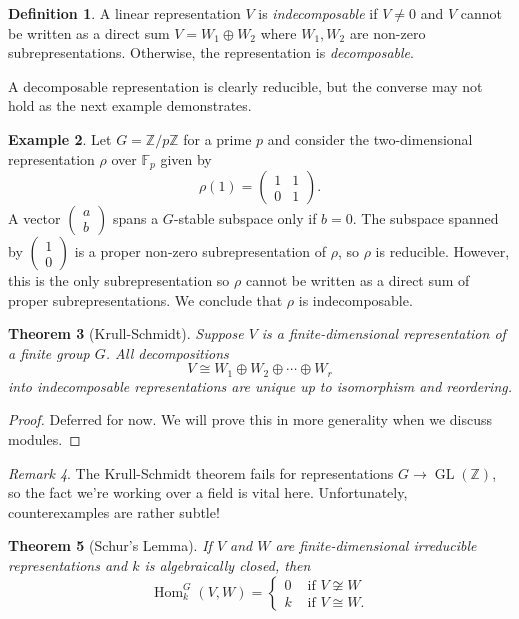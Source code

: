 \documentclass[12pt]{article}
\theoremstyle{plain}
\newtheorem{theorem}{Theorem}[section]
\theoremstyle{definition}
\newtheorem{definition}[theorem]{Definition}
\newtheorem{example}[theorem]{Example}
\theoremstyle{remark}
\newtheorem{remark}[theorem]{Remark}
\numberwithin{equation}{section}
\begin{document}
\begin{definition}
A linear representation $V$ is \emph{indecomposable} if $V \ne 0$ and
$V$ cannot be written as a direct sum $V = W_1 \oplus W_2$ where
$W_1, W_2$ are non-zero subrepresentations.
Otherwise, the representation is \emph{decomposable}.
\end{definition}

A decomposable representation is clearly reducible, but the converse may
not hold as the next example demonstrates.

\begin{example}
Let $G=\mathbb{Z}/p\mathbb{Z}$ for a prime $p$
and consider the two-dimensional representation $\rho$ over $\mathbb{F}_p$
given by
\[
\rho(1) = \begin{pmatrix} 1&1\\0&1 \end{pmatrix} .
\]
A vector $\begin{pmatrix} a\\b \end{pmatrix} $ spans a
$G$-stable subspace only if $b=0$.
The subspace spanned by $\begin{pmatrix} 1\\0 \end{pmatrix}$
is a proper non-zero subrepresentation
of $\rho$, so $\rho$ is reducible.
However, this is the only subrepresentation so $\rho$
cannot be written as a direct sum of proper subrepresentations.
We conclude that $\rho$ is indecomposable.
\end{example}

\begin{theorem}[Krull-Schmidt]
Suppose $V$ is a finite-dimensional representation of a finite group $G$.
All decompositions
\[
V \cong W_1 \oplus W_2 \oplus \cdots \oplus W_r
\]
into indecomposable representations are unique up to isomorphism
and reordering.
\end{theorem}

\begin{proof}
Deferred for now.  We will prove this in more generality when we discuss
modules.
\end{proof}

\begin{remark}
The Krull-Schmidt theorem fails for representations $G \to
\operatorname{GL}(\mathbb{Z})$, so the fact we're working
over a field is vital here.
Unfortunately, counterexamples are rather subtle!
\end{remark}

\begin{theorem}[Schur's Lemma]
If $V$ and $W$ are finite-dimensional irreducible representations
and $k$ is algebraically closed, then
\[
\operatorname{Hom}_k^G(V,W) =
\begin{cases}
0 & \textrm{ if } V \not\cong W\\
k & \textrm{ if } V \cong W.
\end{cases}
\]
\end{theorem}
\end{document}
